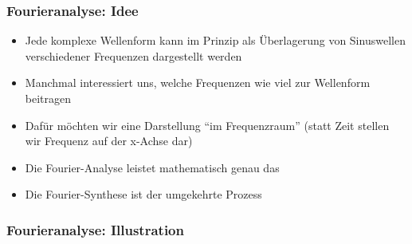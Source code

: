 \documentclass{beamer}
\begin{document}
\begin{frame}
\frametitle{Fourieranalyse: Idee}


\begin{itemize}
\item
Jede komplexe Wellenform kann im Prinzip als Überlagerung von Sinuswellen verschiedener Frequenzen dargestellt werden
\item
Manchmal interessiert uns, welche Frequenzen wie viel zur Wellenform beitragen
\item
Dafür möchten wir eine Darstellung ``im Frequenzraum'' (statt Zeit stellen wir Frequenz auf der x-Achse dar)
\item
Die Fourier-Analyse leistet mathematisch genau das  
\item
Die Fourier-Synthese ist der umgekehrte Prozess
\end{itemize}


\end{frame}



\begin{frame}
\frametitle{Fourieranalyse: Illustration}

\centering
{}

\end{frame}
\end{document}
